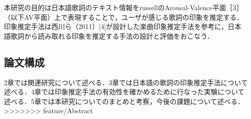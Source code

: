 \documentclass[a4paper,10pt,twocolumn]{jsarticle}
\begin{document}
本研究の目的は日本語歌詞のテキスト情報をrussellのArousal-Valence平面［3］（以下AV平面）上で表現することで，ユーザが感じる歌詞の印象を推定する．
印象推定手法は西川ら（2011）[4]が設計した楽曲印象推定手法を参考に，日本語歌詞から読み取れる印象を推定する手法の設計と評価をおこなう．

\subsection{論文構成}
2章では関連研究について述べる．3章では日本語の歌詞の印象推定手法について述べる．4章では印象推定手法の有効性を確かめるために行なった実験について述べる．5章では本研究についてのまとめと考察，今後の課題について述べる．
>>>>>>> feature/Abstract
%
\end{document}
